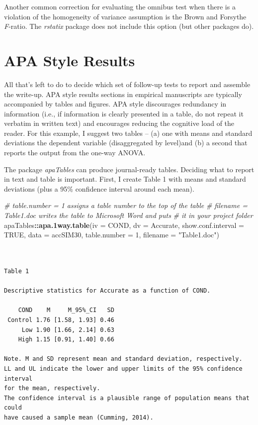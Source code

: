 \documentclass[
  11pt,
]{book}
\newenvironment{Shaded}{\begin{snugshade}}{\end{snugshade}}
\newcommand{\AttributeTok}[1]{\textcolor[rgb]{0.27,0.27,0.27}{#1}}
\newcommand{\CommentTok}[1]{\textcolor[rgb]{0.37,0.37,0.37}{\textit{#1}}}
\newcommand{\ConstantTok}[1]{\textcolor[rgb]{0.37,0.37,0.37}{#1}}
\newcommand{\DecValTok}[1]{\textcolor[rgb]{0.06,0.06,0.06}{#1}}
\newcommand{\FunctionTok}[1]{\textcolor[rgb]{0.27,0.27,0.27}{\textbf{#1}}}
\newcommand{\NormalTok}[1]{#1}
\newcommand{\SpecialCharTok}[1]{\textcolor[rgb]{0.43,0.43,0.43}{\textbf{#1}}}
\newcommand{\StringTok}[1]{\textcolor[rgb]{0.5,0.5,0.5}{#1}}
\begin{document}
Another common correction for evaluating the omnibus test when there is a violation of the homogeneity of variance assumption is the Brown and Forsythe \emph{F}-ratio. The \emph{rstatix} package does not include this option (but other packages do).

\hypertarget{apa-style-results-3}{%
\section{APA Style Results}\label{apa-style-results-3}}

All that's left to do to decide which set of follow-up tests to report and assemble the write-up. APA style results sections in empirical manuscripts are typically accompanied by tables and figures. APA style discourages redundancy in information (i.e., if information is clearly presented in a table, do not repeat it verbatim in written text) and encourages reducing the cognitive load of the reader. For this example, I suggest two tables -- (a) one with means and standard deviations the dependent variable (disaggregated by level)and (b) a second that reports the output from the one-way ANOVA.

The package \emph{apaTables} can produce journal-ready tables. Deciding what to report in text and table is important. First, I create Table 1 with means and standard deviations (plus a 95\% confidence interval around each mean).

\begin{Shaded}
\begin{Highlighting}[]
\CommentTok{\# table.number = 1 assigns a table number to the top of the table}
\CommentTok{\# filename = \textquotesingle{}Table1.doc\textquotesingle{} writes the table to Microsoft Word and puts}
\CommentTok{\# it in your project folder}
\NormalTok{apaTables}\SpecialCharTok{::}\FunctionTok{apa.1way.table}\NormalTok{(}\AttributeTok{iv =}\NormalTok{ COND, }\AttributeTok{dv =}\NormalTok{ Accurate, }\AttributeTok{show.conf.interval =} \ConstantTok{TRUE}\NormalTok{,}
    \AttributeTok{data =}\NormalTok{ accSIM30, }\AttributeTok{table.number =} \DecValTok{1}\NormalTok{, }\AttributeTok{filename =} \StringTok{"Table1.doc"}\NormalTok{)}
\end{Highlighting}
\end{Shaded}

\begin{verbatim}


Table 1 

Descriptive statistics for Accurate as a function of COND.  

    COND    M     M_95%_CI   SD
 Control 1.76 [1.58, 1.93] 0.46
     Low 1.90 [1.66, 2.14] 0.63
    High 1.15 [0.91, 1.40] 0.66

Note. M and SD represent mean and standard deviation, respectively.
LL and UL indicate the lower and upper limits of the 95% confidence interval 
for the mean, respectively. 
The confidence interval is a plausible range of population means that could 
have caused a sample mean (Cumming, 2014). 
\end{verbatim}
\end{document}

